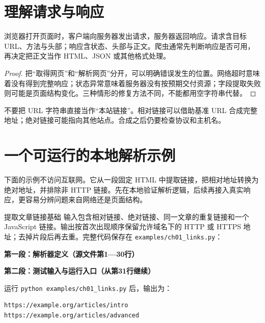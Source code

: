 \section{理解请求与响应}\label{sec:workflow:http}
浏览器打开页面时，客户端向服务器发出请求，服务器返回响应。请求含目标 URL、方法与头部；响应含状态、头部与正文。爬虫通常先判断响应是否可用，再决定把正文当作 HTML、JSON 或其他格式处理。

\begin{proof}
把“取得网页”和“解析网页”分开，可以明确错误发生的位置。网络超时意味着没有得到完整响应；状态异常意味着服务器没有按预期交付资源；字段提取失败则可能是页面结构变化。三种情形的修复方法不同，不能都用空字符串代替。
\end{proof}

\begin{warning}
不要把 URL 字符串直接当作“本站链接”。相对链接可以借助基准 URL 合成完整地址；绝对链接可能指向其他站点。合成之后仍要检查协议和主机名。
\end{warning}

\section{一个可运行的本地解析示例}\label{sec:workflow:example}
下面的示例不访问互联网。它从一段固定 HTML 中提取链接，把相对地址转换为绝对地址，并排除非 HTTP 链接。先在本地验证解析逻辑，后续再接入真实响应，更容易分辨问题来自网络还是页面结构。

\clearpage
\begin{example}{提取文章链接}{基础}
输入包含相对链接、绝对链接、同一文章的重复链接和一个 JavaScript 链接。输出按首次出现顺序保留允许域名下的 HTTP 或 HTTPS 地址；去掉片段后再去重。完整代码保存在 \texttt{examples/ch01\_links.py}：
\par\medskip
\textbf{第一段：解析器定义（源文件第1—30行）}\par
{}
\par\smallskip\textbf{第二段：测试输入与运行入口（从第31行继续）}\par
{}
\par\medskip
运行 \texttt{python examples/ch01\_links.py} 后，输出为：
\begin{Verbatim}[numbers=none]
https://example.org/articles/intro
https://example.org/articles/advanced
\end{Verbatim}
\end{example}


